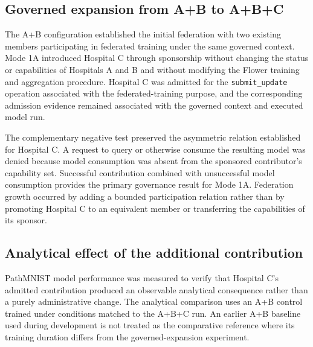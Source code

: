 \documentclass[twoside,11pt]{article}
\begin{document}
\subsection{Governed expansion from A+B to A+B+C}

The A+B configuration established the initial federation with two existing members participating in federated training under the same governed context. Mode 1A introduced Hospital C through sponsorship without changing the status or capabilities of Hospitals A and B and without modifying the Flower training and aggregation procedure. Hospital C was admitted for the \texttt{submit\_update} operation associated with the federated-training purpose, and the corresponding admission evidence remained associated with the governed context and executed model run.

The complementary negative test preserved the asymmetric relation established for Hospital C. A request to query or otherwise consume the resulting model was denied because model consumption was absent from the sponsored contributor's capability set. Successful contribution combined with unsuccessful model consumption   provides the primary governance result for Mode 1A. Federation growth occurred by adding a bounded participation relation rather than by promoting Hospital C to an equivalent member or transferring the capabilities of its sponsor.

\subsection{Analytical effect of the additional contribution}

PathMNIST model performance was measured to verify that Hospital C's admitted contribution produced an observable analytical consequence rather than a purely administrative change. The analytical comparison uses an A+B control trained under conditions matched to the A+B+C run. An earlier A+B baseline used during development is not treated as the comparative reference where its training duration differs from the governed-expansion experiment.
\end{document}
